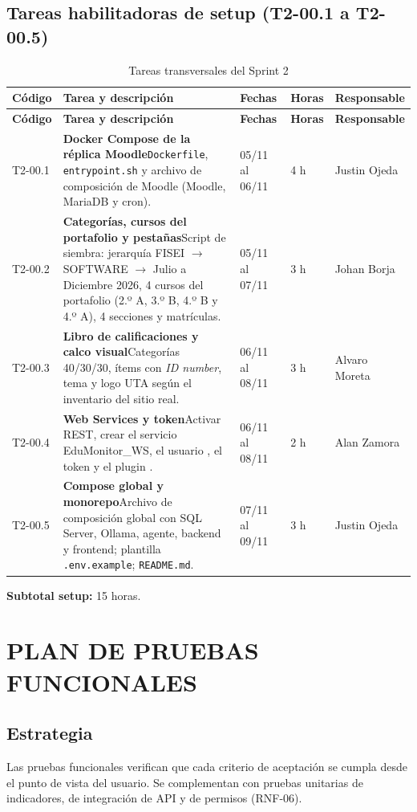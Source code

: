 \documentclass[11pt,a4paper]{article}
\newcommand{\hd}[1]{\textbf{#1}}
\newcommand{\tarea}[6]{#1 & \textbf{#2}\newline #3 & #4 & #5 & #6 \\ \hline}
\begin{document}
\subsection{Tareas habilitadoras de setup (T2-00.1 a T2-00.5)}
\begin{longtable}{|R{1.6cm}|R{5.8cm}|R{2.2cm}|R{1.3cm}|R{2.7cm}|}
\caption{Tareas transversales del Sprint 2}\\
\hline \hd{Código} & \hd{Tarea y descripción} & \hd{Fechas} & \hd{Horas} & \hd{Responsable}\\ \hline \endfirsthead
\hline \hd{Código} & \hd{Tarea y descripción} & \hd{Fechas} & \hd{Horas} & \hd{Responsable}\\ \hline \endhead
\tarea{T2-00.1}{Docker Compose de la réplica Moodle}{\texttt{Dockerfile}, \texttt{entrypoint.sh} y archivo de composición de Moodle (Moodle, MariaDB y cron).}{05/11 al 06/11}{4 h}{Justin Ojeda}
\tarea{T2-00.2}{Categorías, cursos del portafolio y pestañas}{Script de siembra: jerarquía FISEI $\rightarrow$ SOFTWARE $\rightarrow$ Julio a Diciembre 2026, 4 cursos del portafolio (2.º A, 3.º B, 4.º B y 4.º A), 4 secciones y matrículas.}{05/11 al 07/11}{3 h}{Johan Borja}
\tarea{T2-00.3}{Libro de calificaciones y calco visual}{Categorías 40/30/30, ítems con \emph{ID number}, tema y logo UTA según el inventario del sitio real.}{06/11 al 08/11}{3 h}{Alvaro Moreta}
\tarea{T2-00.4}{Web Services y token}{Activar REST, crear el servicio EduMonitor\_WS, el usuario \cd{svc_edumonitor}, el token y el plugin \cd{local_edumonitor}.}{06/11 al 08/11}{2 h}{Alan Zamora}
\tarea{T2-00.5}{Compose global y monorepo}{Archivo de composición global con SQL Server, Ollama, agente, backend y frontend; plantilla \texttt{.env.example}; \texttt{README.md}.}{07/11 al 09/11}{3 h}{Justin Ojeda}
\end{longtable}
\textbf{Subtotal setup:} 15 horas.

\section{PLAN DE PRUEBAS FUNCIONALES}

\subsection{Estrategia}
Las pruebas funcionales verifican que cada criterio de aceptación se cumpla desde el punto de vista del usuario. Se complementan con pruebas unitarias de indicadores, de integración de API y de permisos (RNF-06).
\end{document}
